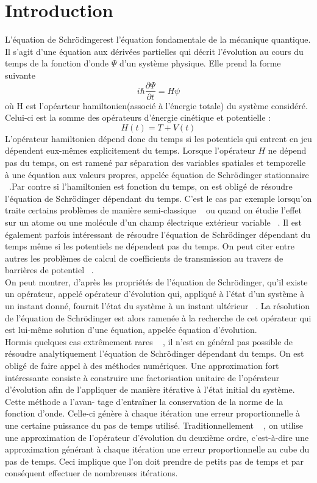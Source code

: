\documentclass[a4paper, 12pt]{report}
\begin{document}
  \newpage
  \setcounter{page}{5}
  \chapter*{Introduction}
  L'équation de Schrödingerest l'équation fondamentale de la mécanique quantique. Il s'agit d'une équation aux dérivées partielles qui décrit l'évolution au cours du temps de la fonction d'onde $\Psi$ d'un système physique. Elle prend la forme suivante
  $$i\hbar\frac{\partial \Psi}{\partial t} = H\psi$$
  où H est l'opéarteur hamiltonien(associé à l'énergie totale) du système considéré. Celui-ci
  est la somme des opérateurs d'énergie cinétique et potentielle : 
  $$H(t) = T + V(t)$$
  L’opérateur hamiltonien dépend donc du temps si les potentiels qui entrent en jeu
dépendent eux-mêmes explicitement du temps. Lorsque l’opérateur $H$ ne dépend
pas du temps, on est ramené par séparation des variables spatiales et temporelle
à une équation aux valeurs propres, appelée équation de Schrödinger stationnaire ~\cite{[1]}.Par contre si l’hamiltonien est fonction du temps, on est obligé de résoudre
l'équation de Schrödinger dépendant du temps. C’est le cas par exemple lorsqu’on
traite certains problèmes de manière semi-classique ~\cite{[2], [3]} ou quand on étudie l’effet
sur un atome ou une molécule d’un champ électrique extérieur variable ~\cite{[4]}. Il est
également parfois intéressant de résoudre l’équation de Schrödinger dépendant du
temps même si les potentiels ne dépendent pas du temps. On peut citer entre autres les
problèmes de calcul de coefficients de transmission au travers de barrières de potentiel ~\cite{[5]}. \\

On peut montrer, d’après les propriétés de l’équation de Schrödinger, qu’il existe un
opérateur, appelé opérateur d’évolution qui, appliqué à l’état d’un système à un instant
donné, fournit l’état du système à un instant ultérieur ~\cite{[1]}. La résolution de l’équation de
Schrödinger est alors ramenée à la recherche de cet opérateur qui est lui-même solution
d’une équation, appelée équation d’évolution. \\

Hormis quelques cas extrêmement rares ~\cite{[6]} , il n’est en général pas possible de
résoudre analytiquement l’équation de Schrödinger dépendant du temps. On est
obligé de faire appel à des méthodes numériques. Une approximation fort intéressante
consiste à construire une factorisation unitaire de l’opérateur d’évolution afin de
l’appliquer de manière itérative à l’état initial du système. Cette méthode a l’avan-
tage d’entraîner la conservation de la norme de la fonction d’onde. Celle-ci génère
à chaque itération une erreur proportionnelle à une certaine puissance du pas de
temps utilisé. Traditionnellement ~\cite{[2], [3]} , on utilise une approximation de l’opérateur
d’évolution du deuxième ordre, c’est-à-dire une approximation générant à chaque itération une erreur proportionnelle au cube du pas de temps. Ceci implique que l’on
doit prendre de petits pas de temps et par conséquent effectuer de nombreuses itérations.
\end{document}
